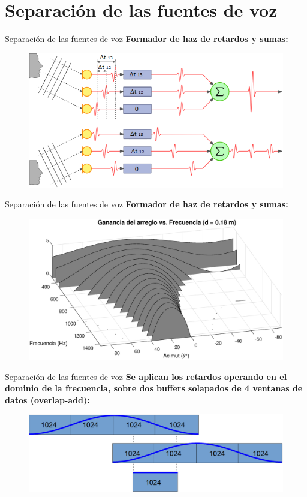 \documentclass[12pt,aspectratio=169]{beamer}
\begin{document}
	\section{Separación de las fuentes de voz}
	
	\begin{frame}{Separación de las fuentes de voz}
		\textbf{Formador de haz de retardos y sumas:}\\	
		\vspace{5mm}
		\begin{figure}[h]
			\centering
			\includegraphics[width=0.7\linewidth]{figures/steer}
		\end{figure}
	\end{frame}
	
	\begin{frame}{Separación de las fuentes de voz}
		\textbf{Formador de haz de retardos y sumas:}\\	
		\vspace{5mm}
		\begin{figure}[h]
			\centering
			\includegraphics[width=0.8\linewidth]{figures/patternvsfreq}
		\end{figure}
	\end{frame}
	
	\begin{frame}{Separación de las fuentes de voz}
		\textbf{Se aplican los retardos operando en el dominio de la frecuencia, sobre dos buffers solapados de 4 ventanas de datos (overlap-add):}\\		
		\vspace{5mm}
		\begin{figure}[h]
			\centering
			\includegraphics[width=0.8\linewidth]{figures/Buffers.eps}
		\end{figure}
	\end{frame}
	
\end{document}
